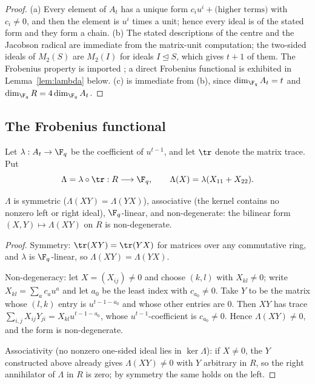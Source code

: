 \begin{proof}
(a) Every element of $A_t$ has a unique form $c_{i}u^i+\text{(higher terms)}$
with $c_i\ne0$, and then the element is $u^i$ times a unit; hence every ideal is
of the stated form and they form a chain. (b) The stated descriptions of the
centre and the Jacobson radical are immediate from the matrix-unit computation;
the two-sided ideals of $M_2(S)$ are $M_2(I)$ for ideals $I\trianglelefteq S$,
which gives $t+1$ of them. The Frobenius property is imported
\cite{Wood1999Duality}; a direct Frobenius functional is exhibited in
Lemma~\ref{lem:lambda} below. (c) is immediate from (b), since
$\dim_{\F_q}A_t=t$ and $\dim_{\F_q}R=4\dim_{\F_q}A_t$.
\end{proof}

\subsection{The Frobenius functional}\label{subsec:lambda}

Let $\lambda:A_t\to\F_q$ be the coefficient of $u^{t-1}$, and let
$\tr$ denote the matrix trace. Put
\begin{equation}\label{eq:Lambda}
  \Lambda=\lambda\circ\tr:R\longrightarrow\F_q,\qquad
  \Lambda(X)=\lambda(X_{11}+X_{22}) .
\end{equation}

\begin{lemma}\label{lem:lambda}
$\Lambda$ is symmetric ($\Lambda(XY)=\Lambda(YX)$), associative (the kernel
contains no nonzero left or right ideal), $\F_q$-linear, and non-degenerate:
the bilinear form $(X,Y)\mapsto\Lambda(XY)$ on $R$ is non-degenerate.
\end{lemma}

\begin{proof}
Symmetry: $\tr(XY)=\tr(YX)$ for matrices over any commutative ring, and $\lambda$
is $\F_q$-linear, so $\Lambda(XY)=\Lambda(YX)$.

Non-degeneracy: let $X=(X_{ij})\ne0$ and choose $(k,l)$ with $X_{kl}\ne0$;
write $X_{kl}=\sum_ac_au^a$ and let $a_0$ be the least index with $c_{a_0}\ne0$.
Take $Y$ to be the matrix whose $(l,k)$ entry is $u^{t-1-a_0}$ and whose other
entries are $0$. Then $XY$ has trace
$\sum_{i,j}X_{ij}Y_{ji}=X_{kl}u^{t-1-a_0}$, whose $u^{t-1}$-coefficient is
$c_{a_0}\ne0$. Hence $\Lambda(XY)\ne0$, and the form is non-degenerate.

Associativity (no nonzero one-sided ideal lies in $\ker\Lambda$): if
$X\ne0$, the $Y$ constructed above already gives $\Lambda(XY)\ne0$ with $Y$
arbitrary in $R$, so the right annihilator of $\Lambda$ in $R$ is zero; by
symmetry the same holds on the left.
\end{proof}

